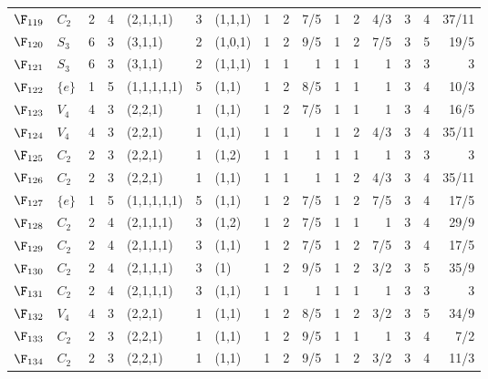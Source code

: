 \begin{landscape}
{\begin{longtable}{@{}l l r r l r l rrr rrr rrr@{}}
\addlinespace[3pt]
\textbf{$\F_{119}$} & $C_{2}$ & 2 & 4 & (2,1,1,1) & 3 & (1,1,1) & 1 & 2 & 7/5 & 1 & 2 & 4/3 & 3 & 4 & 37/11 \\
\addlinespace[3pt]
\textbf{$\F_{120}$} & $S_{3}$ & 6 & 3 & (3,1,1) & 2 & (1,0,1) & 1 & 2 & 9/5 & 1 & 2 & 7/5 & 3 & 5 & 19/5 \\
\addlinespace[3pt]
\textbf{$\F_{121}$} & $S_{3}$ & 6 & 3 & (3,1,1) & 2 & (1,1,1) & 1 & 1 & 1 & 1 & 1 & 1 & 3 & 3 & 3 \\
\addlinespace[3pt]
\textbf{$\F_{122}$} & $\{e\}$ & 1 & 5 & (1,1,1,1,1) & 5 & (1,1) & 1 & 2 & 8/5 & 1 & 1 & 1 & 3 & 4 & 10/3 \\
\addlinespace[3pt]
\textbf{$\F_{123}$} & $V_{4}$ & 4 & 3 & (2,2,1) & 1 & (1,1) & 1 & 2 & 7/5 & 1 & 1 & 1 & 3 & 4 & 16/5 \\
\addlinespace[3pt]
\textbf{$\F_{124}$} & $V_{4}$ & 4 & 3 & (2,2,1) & 1 & (1,1) & 1 & 1 & 1 & 1 & 2 & 4/3 & 3 & 4 & 35/11 \\
\addlinespace[3pt]
\textbf{$\F_{125}$} & $C_{2}$ & 2 & 3 & (2,2,1) & 1 & (1,2) & 1 & 1 & 1 & 1 & 1 & 1 & 3 & 3 & 3 \\
\addlinespace[3pt]
\textbf{$\F_{126}$} & $C_{2}$ & 2 & 3 & (2,2,1) & 1 & (1,1) & 1 & 1 & 1 & 1 & 2 & 4/3 & 3 & 4 & 35/11 \\
\addlinespace[3pt]
\textbf{$\F_{127}$} & $\{e\}$ & 1 & 5 & (1,1,1,1,1) & 5 & (1,1) & 1 & 2 & 7/5 & 1 & 2 & 7/5 & 3 & 4 & 17/5 \\
\addlinespace[3pt]
\textbf{$\F_{128}$} & $C_{2}$ & 2 & 4 & (2,1,1,1) & 3 & (1,2) & 1 & 2 & 7/5 & 1 & 1 & 1 & 3 & 4 & 29/9 \\
\addlinespace[3pt]
\textbf{$\F_{129}$} & $C_{2}$ & 2 & 4 & (2,1,1,1) & 3 & (1,1) & 1 & 2 & 7/5 & 1 & 2 & 7/5 & 3 & 4 & 17/5 \\
\addlinespace[3pt]
\textbf{$\F_{130}$} & $C_{2}$ & 2 & 4 & (2,1,1,1) & 3 & (1) & 1 & 2 & 9/5 & 1 & 2 & 3/2 & 3 & 5 & 35/9 \\
\addlinespace[3pt]
\textbf{$\F_{131}$} & $C_{2}$ & 2 & 4 & (2,1,1,1) & 3 & (1,1) & 1 & 1 & 1 & 1 & 1 & 1 & 3 & 3 & 3 \\
\addlinespace[3pt]
\textbf{$\F_{132}$} & $V_{4}$ & 4 & 3 & (2,2,1) & 1 & (1,1) & 1 & 2 & 8/5 & 1 & 2 & 3/2 & 3 & 5 & 34/9 \\
\addlinespace[3pt]
\textbf{$\F_{133}$} & $C_{2}$ & 2 & 3 & (2,2,1) & 1 & (1,1) & 1 & 2 & 9/5 & 1 & 1 & 1 & 3 & 4 & 7/2 \\
\addlinespace[3pt]
\textbf{$\F_{134}$} & $C_{2}$ & 2 & 3 & (2,2,1) & 1 & (1,1) & 1 & 2 & 9/5 & 1 & 2 & 3/2 & 3 & 4 & 11/3 \\

\end{longtable}}
\end{landscape}
